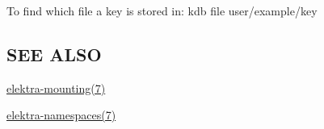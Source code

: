 To find which file a key is stored in\+: {\ttfamily kdb file user/example/key}

\subsection*{S\+E\+E A\+L\+S\+O}


\begin{DoxyItemize}
\item \hyperlink{md_doc_help_elektra-mounting_doc_help_elektra-mounting_md}{elektra-\/mounting(7)}
\item \hyperlink{md_doc_help_elektra-namespaces_doc_help_elektra-namespaces_md}{elektra-\/namespaces(7)} 
\end{DoxyItemize}